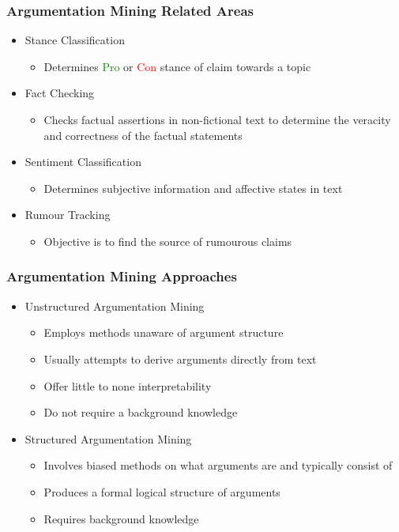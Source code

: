 \documentclass{beamer}
\begin{document}
\begin{frame}
\frametitle{Argumentation Mining Related Areas}

\begin{itemize}
\item Stance Classification
	\begin{itemize}
		\item Determines \textcolor{green}{Pro} or \textcolor{red}{Con} stance of claim towards a topic
	\end{itemize}
\item Fact Checking
	\begin{itemize}
		\item Checks factual assertions in non-fictional text to determine the
			veracity and correctness of the factual statements
	\end{itemize}
\item Sentiment Classification
	\begin{itemize}
		\item Determines subjective information and affective states in text
	\end{itemize}
\item Rumour Tracking
	\begin{itemize}
		\item Objective is to find the source of rumourous claims
	\end{itemize}
\end{itemize}

\end{frame}

\begin{frame}
\frametitle{Argumentation Mining Approaches}

\begin{itemize}
\item Unstructured Argumentation Mining
	\begin{itemize}
		\item Employs methods unaware of argument structure
		\item Usually attempts to derive arguments directly from text
		\item Offer little to none interpretability
		\item Do not require a background knowledge
	\end{itemize}
\item Structured Argumentation Mining
	\begin{itemize}
		\item Involves biased methods on what arguments are and typically consist of
		\item Produces a formal logical structure of arguments
		\item Requires background knowledge
	\end{itemize}
\end{itemize}

\end{frame}
\end{document}
